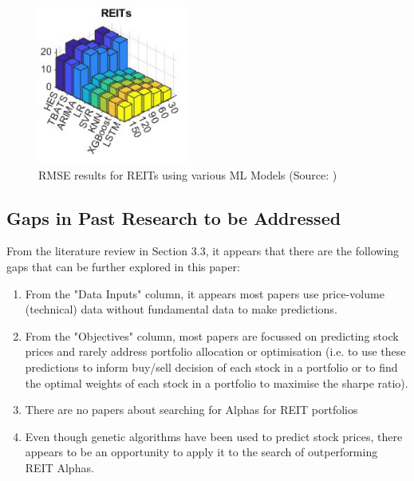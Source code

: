 \documentclass[a4paper,12pt]{report}
\renewcommand\thechapter{\Roman{chapter}}
\numberwithin{equation}{section}
\theoremstyle{definition}
\begin{document}
\begin{figure}[H]
  \centerline{\includegraphics[width=5cm]{lit_review_reit_rmse}}
  \caption{RMSE results for REITs using various ML Models (Source: \cite{habbab_-depth_2024})}
  \label{fig:lit_review_rmse}
\end{figure}


\subsection{Gaps in Past Research to be Addressed}
From the literature review in Section 3.3, it appears that there are the following gaps that can be further explored in this paper:
\begin{enumerate}

  \item {From the "Data Inputs" column, it appears most papers use price-volume (technical) data without fundamental data to make predictions.}
  \item {From the "Objectives" column, most papers are focussed on predicting stock prices and rarely address portfolio allocation or optimisation (i.e. to use these predictions to inform buy/sell decision of each stock in a portfolio or to find the optimal weights of each stock in a portfolio to maximise the sharpe ratio).}
  \item {There are no papers about searching for Alphas for REIT portfolios}
  \item {Even though genetic algorithms have been used to predict stock prices, there appears to be an opportunity to apply it to the search of outperforming REIT Alphas.}
  
\end{enumerate}






\titleformat{\chapter}[block]
  {\normalfont\huge\bfseries}{\thechapter.}{1em}{\Huge\centering}
\titlespacing*{\chapter}{0pt}{150pt}{0pt}
\setcounter{chapter}{1}
\renewcommand{\thechapter}{\Roman{chapter}}
\end{document}
